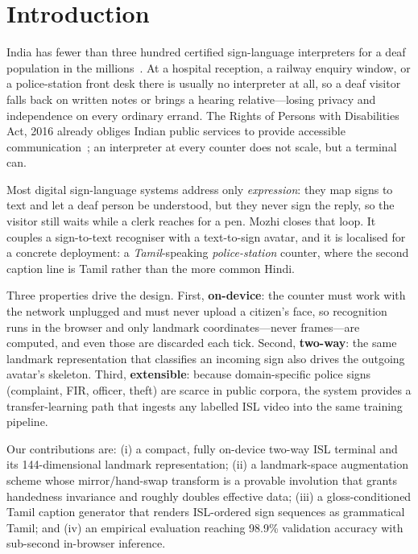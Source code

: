 \documentclass[conference]{IEEEtran}
\begin{document}
\section{Introduction}
India has fewer than three hundred certified sign-language interpreters for a
deaf population in the millions~\cite{rpwd}. At a hospital reception, a railway
enquiry window, or a police-station front desk there is usually no interpreter
at all, so a deaf visitor falls back on written notes or brings a hearing
relative---losing privacy and independence on every ordinary errand. The Rights
of Persons with Disabilities Act, 2016 already obliges Indian public services to
provide accessible communication~\cite{rpwd}; an interpreter at every counter
does not scale, but a terminal can.

Most digital sign-language systems address only \emph{expression}: they map
signs to text and let a deaf person be understood, but they never sign the
reply, so the visitor still waits while a clerk reaches for a pen. Mozhi closes
that loop. It couples a sign-to-text recogniser with a text-to-sign avatar, and
it is localised for a concrete deployment: a \emph{Tamil}-speaking
\emph{police-station} counter, where the second caption line is Tamil rather
than the more common Hindi.

Three properties drive the design. First, \textbf{on-device}: the counter must
work with the network unplugged and must never upload a citizen's face, so
recognition runs in the browser and only landmark coordinates---never
frames---are computed, and even those are discarded each tick. Second,
\textbf{two-way}: the same landmark representation that classifies an incoming
sign also drives the outgoing avatar's skeleton. Third, \textbf{extensible}:
because domain-specific police signs (complaint, FIR, officer, theft) are scarce
in public corpora, the system provides a transfer-learning path that ingests any
labelled ISL video into the same training pipeline.

Our contributions are: (i) a compact, fully on-device two-way ISL terminal and
its 144-dimensional landmark representation; (ii) a landmark-space augmentation
scheme whose mirror/hand-swap transform is a provable involution that grants
handedness invariance and roughly doubles effective data; (iii) a
gloss-conditioned Tamil caption generator that renders ISL-ordered sign
sequences as grammatical Tamil; and (iv) an empirical evaluation reaching
98.9\% validation accuracy with sub-second in-browser inference.
\end{document}
